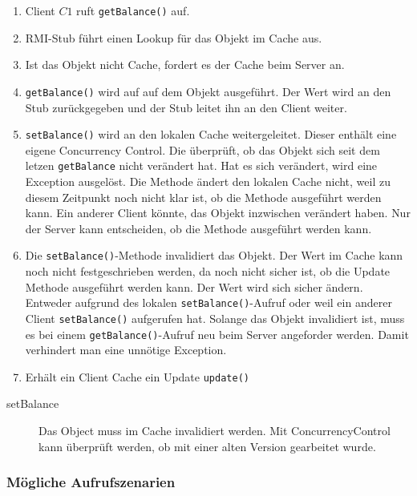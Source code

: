 \begin{enumerate}
\item Client $C1$ ruft \verb+getBalance()+ auf.
\item RMI-Stub führt einen Lookup für das Objekt im Cache aus.
\item Ist das Objekt nicht Cache, fordert es der Cache beim Server an.
\item \verb+getBalance()+ wird auf auf dem Objekt ausgeführt. Der Wert wird an den Stub zurückgegeben und der Stub leitet ihn an den Client weiter.
\item \verb+setBalance()+ wird an den lokalen Cache weitergeleitet. Dieser enthält eine eigene Concurrency Control. Die überprüft, ob das Objekt sich seit dem letzen \verb+getBalance+ nicht verändert hat. Hat es sich verändert, wird eine Exception ausgelöst. Die Methode ändert den lokalen Cache nicht, weil zu diesem Zeitpunkt noch nicht klar ist, ob die Methode ausgeführt werden kann. Ein anderer Client könnte, das Objekt inzwischen verändert haben. Nur der Server kann entscheiden, ob die Methode ausgeführt werden kann.
\item Die \verb+setBalance()+-Methode invalidiert das Objekt. Der Wert im Cache kann noch nicht festgeschrieben werden, da noch nicht sicher ist, ob die Update Methode ausgeführt werden kann. Der Wert wird sich sicher ändern. Entweder aufgrund des lokalen \verb+setBalance()+-Aufruf oder weil ein anderer Client \verb+setBalance()+ aufgerufen hat. Solange das Objekt invalidiert ist, muss es bei einem \verb+getBalance()+-Aufruf neu beim Server angeforder werden. Damit verhindert man eine unnötige Exception.
\item Erhält ein Client Cache ein Update \verb+update()+
\end{enumerate}

\begin{description}
\item [setBalance] Das Object muss im Cache invalidiert werden. Mit ConcurrencyControl kann überprüft werden, ob mit einer alten Version gearbeitet wurde.
\end{description}

\subsubsection{Mögliche Aufrufszenarien}
\label{sec:mogl-aufr}

